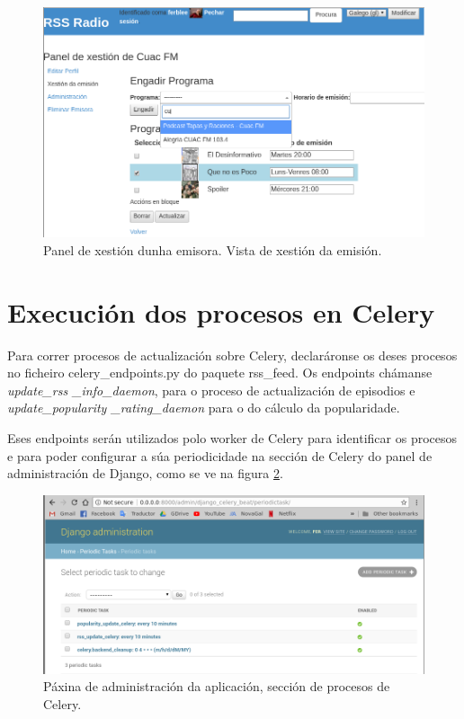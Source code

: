\begin{figure}[h]
	\centering
	\includegraphics[scale=0.5,keepaspectratio=true]{./images/impl-panel.png}
	\caption{Panel de xestión dunha emisora. Vista de xestión da emisión. }
	\label{fig:panel}
\end{figure} 


\section{Execución dos procesos en Celery}

Para correr procesos de actualización sobre Celery, declaráronse os  deses procesos no ficheiro celery\_endpoints.py do paquete rss\_feed. Os endpoints chámanse \textit{update\_rss \_info\_daemon}, para o proceso de actualización de episodios e \textit{update\_popularity \_rating\_daemon} para o do cálculo da popularidade. 

Eses endpoints serán utilizados polo worker de Celery para identificar os procesos e para poder configurar a súa periodicidade na sección de Celery do panel de administración de Django, como se ve na figura \ref{fig:celery}.

\begin{figure}[h]
	\centering
	\includegraphics[scale=0.45,keepaspectratio=true]{./images/celery.png}
	\caption{Páxina de administración da aplicación, sección de procesos de Celery.}
	\label{fig:celery}
\end{figure} 


